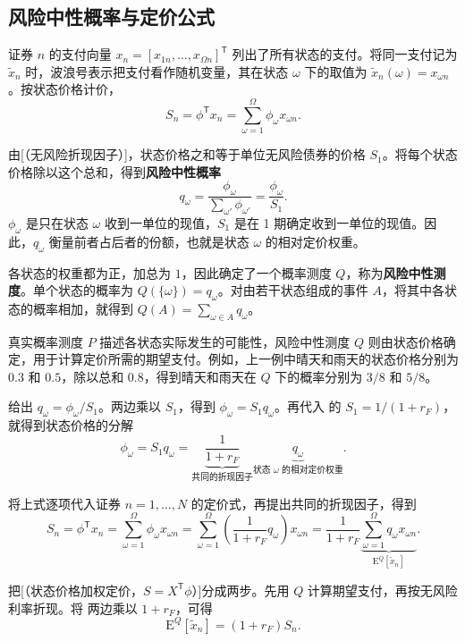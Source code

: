 \subsection{风险中性概率与定价公式}\label{sec:wj-four-risk-neutral-probability}
证券 $n$ 的支付向量 $x_n=[x_{1n},\ldots,x_{\Omega n}]^{\mathsf T}$ 列出了所有状态的支付。将同一支付记为 $\tilde{x}_n$ 时，波浪号表示把支付看作随机变量，其在状态 $\omega$ 下的取值为 $\tilde{x}_n(\omega)=x_{\omega n}$。按状态价格计价，
\[
    S_n=\phi^{\mathsf T}x_n=\sum_{\omega=1}^{\Omega}\phi_{\omega}x_{\omega n}.
\]

\begin{tcolorbox}[knowledge,title=风险中性概率与风险中性测度]
由[（无风险折现因子）]，状态价格之和等于单位无风险债券的价格 $S_1$。将每个状态价格除以这个总和，得到\textbf{风险中性概率}
\begin{equation}
    q_{\omega}=\frac{\phi_{\omega}}{\sum_{\omega'}\phi_{\omega'}}
              =\frac{\phi_\omega}{S_1}.
 \label{eq:wj-four-8}
\end{equation}
$\phi_\omega$ 是只在状态 $\omega$ 收到一单位的现值，$S_1$ 是在 1 期确定收到一单位的现值。因此，$q_\omega$ 衡量前者占后者的份额，也就是状态 $\omega$ 的相对定价权重。

各状态的权重都为正，加总为 $1$，因此确定了一个概率测度 $Q$，称为\textbf{风险中性测度}。单个状态的概率为 $Q(\{\omega\})=q_\omega$。对由若干状态组成的事件 $A$，将其中各状态的概率相加，就得到 $Q(A)=\sum_{\omega\in A}q_\omega$。
\end{tcolorbox}

真实概率测度 $P$ 描述各状态实际发生的可能性，风险中性测度 $Q$ 则由状态价格确定，用于计算定价所需的期望支付。例如，上一例中晴天和雨天的状态价格分别为 $0.3$ 和 $0.5$，除以总和 $0.8$，得到晴天和雨天在 $Q$ 下的概率分别为 $3/8$ 和 $5/8$。

\begin{tcolorbox}[knowledge,title=风险中性定价]
 给出 $q_\omega=\phi_\omega/S_1$。两边乘以 $S_1$，得到 $\phi_\omega=S_1q_\omega$。再代入 的 $S_1=1/(1+r_F)$，就得到状态价格的分解
\[
 \phi_\omega=S_1q_\omega
 =\underbrace{\frac{1}{1+r_F}}_{\text{共同的折现因子}}
  \underbrace{q_\omega}_{\text{状态 $\omega$ 的相对定价权重}}.
\]

将上式逐项代入证券 $n=1,\ldots,N$ 的定价式，再提出共同的折现因子，得到
\begin{equation}
 S_n = \phi^{\mathsf T}x_n
     = \sum_{\omega=1}^{\Omega}\phi_\omega x_{\omega n}
     = \sum_{\omega=1}^{\Omega}\left(\frac{1}{1+r_F}q_\omega\right)x_{\omega n}
     = \frac{1}{1+r_F}
       \underbrace{\sum_{\omega=1}^{\Omega}q_\omega x_{\omega n}}_{\mathrm{E}^{Q}[\tilde{x}_n]}.
 \label{eq:wj-four-9}
\end{equation}
\end{tcolorbox}
把[（状态价格加权定价，$S=X^{\mathsf T}\phi$）]分成两步。先用 $Q$ 计算期望支付，再按无风险利率折现。将 两边乘以 $1+r_F$，可得
\[
\mathrm E^Q[\tilde x_n]=(1+r_F)S_n.
\]

